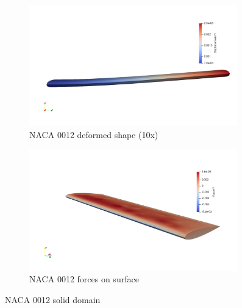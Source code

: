 \begin{figure}[htbp!]
	\centering
	\begin{subfigure}{.75\textwidth}
		\centering
	    \includegraphics[width=0.99\textwidth]{images/heathcote/naca0012_dy.png}
	    \caption{NACA 0012 deformed shape (10x)}
	    \label{fig:hc-wing-disp}
	\end{subfigure}
	\newline
	
	\centering
	\begin{subfigure}{.75\textwidth}
		\centering
    	\includegraphics[width=0.99\textwidth]{images/heathcote/naca0012_Fy.png}
    	\caption{NACA 0012 forces on surface}
    	\label{fig:hc-surf-forces}
	\end{subfigure}
	\caption{NACA 0012 solid domain}
	\label{fig:hc-solid-sol}
\end{figure}

